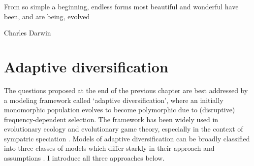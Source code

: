 \epigraph{\justifying From so simple a beginning, endless forms most beautiful and wonderful have been, and are being, evolved}{Charles Darwin}

\section{Adaptive diversification}\label{AD}
The questions proposed at the end of the previous chapter are best addressed by a modeling framework called `adaptive diversification', where an initially monomorphic population evolves to become polymorphic due to (disruptive) frequency-dependent selection. The framework has been widely used in evolutionary ecology and evolutionary game theory, especially in the context of sympatric speciation \citep{dieckmann_origin_1999}. Models of adaptive diversification can be broadly classified into three classes of models which differ starkly in their approach and assumptions \citep{doebeli_adaptive_2011}. I introduce all three approaches below.

